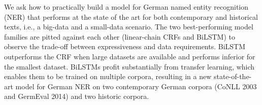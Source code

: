 We ask how to practically build a model for German named entity recognition (NER) that performs at the state of the art for both contemporary and historical texts, i.e., a big-data and a small-data scenario.  The two best-performing model families are pitted against each other (linear-chain CRFs and BiLSTM) to observe the trade-off between expressiveness and data requirements. BiLSTM outperforms the CRF when large datasets are available and performs inferior for the smallest dataset. BiLSTMs profit substantially from transfer learning, which enables them to be trained on multiple corpora, resulting in a new state-of-the-art model for German NER on two contemporary German corpora (CoNLL 2003 and GermEval 2014) and two historic corpora.
